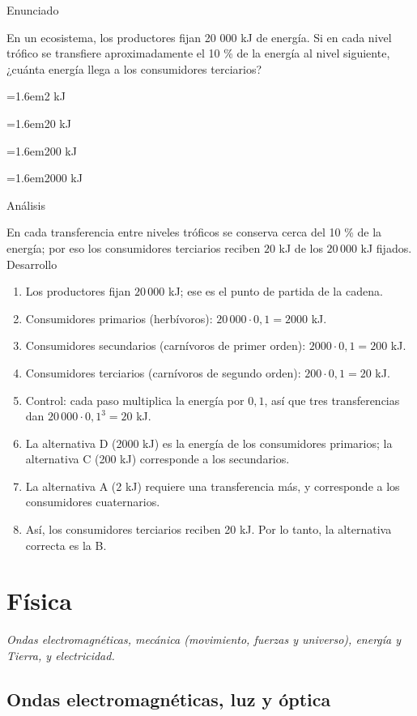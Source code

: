 \documentclass[10pt,a4paper,twocolumn]{article}
\newcommand{\alternativa}[2]{\par\noindent\hangindent=1.6em\hangafter=1\makebox[1.6em][l]{\tecla{#1}}#2\par}
\newcommand{\clave}[1]{\par\smallskip{\sffamily\footnotesize\color{esmeralda} Clave \teclaok{#1}}\par}
\begin{document}
\begin{ejemplo}
{\sffamily\footnotesize\color{zinc500} Enunciado}\par
En un ecosistema, los productores fijan 20 000 kJ de energía. Si en cada nivel trófico se transfiere aproximadamente el 10 \% de la energía al nivel siguiente, ¿cuánta energía llega a los consumidores terciarios?
\alternativa{A}{2 kJ}
\alternativa{B}{20 kJ}
\alternativa{C}{200 kJ}
\alternativa{D}{2000 kJ}
\clave{B}
{\sffamily\footnotesize\color{zinc500} Análisis}\par En cada transferencia entre niveles tróficos se conserva cerca del 10 \% de la energía; por eso los consumidores terciarios reciben $20$ kJ de los $20\,000$ kJ fijados.
{\sffamily\footnotesize\color{zinc500} Desarrollo}
\begin{enumerate}
  \item Los productores fijan $20\,000$ kJ; ese es el punto de partida de la cadena.
  \item Consumidores primarios (herbívoros): $20\,000 \cdot 0{,}1 = 2000$ kJ.
  \item Consumidores secundarios (carnívoros de primer orden): $2000 \cdot 0{,}1 = 200$ kJ.
  \item Consumidores terciarios (carnívoros de segundo orden): $200 \cdot 0{,}1 = 20$ kJ.
  \item Control: cada paso multiplica la energía por $0{,}1$, así que tres transferencias dan $20\,000 \cdot 0{,}1^3 = 20$ kJ.
  \item La alternativa D (2000 kJ) es la energía de los consumidores primarios; la alternativa C (200 kJ) corresponde a los secundarios.
  \item La alternativa A (2 kJ) requiere una transferencia más, y corresponde a los consumidores cuaternarios.
  \item Así, los consumidores terciarios reciben 20 kJ. Por lo tanto, la alternativa correcta es la B.
\end{enumerate}
\end{ejemplo}

\section{Física}

{\itshape\color{zinc700} Ondas electromagnéticas, mecánica (movimiento, fuerzas y universo), energía y Tierra, y electricidad.}

\subsection{Ondas electromagnéticas, luz y óptica}
\end{document}
